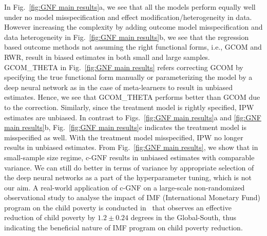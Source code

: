 \documentclass[letterpaper]{article} %
\begin{document}
In Fig.~\ref{fig:GNF main results}a, we see that all the models perform equally well under no model misspecification and effect modification/heterogeneity in data.
However increasing the complexity by adding outcome model misspecification and data heterogeneity in Fig.~\ref{fig:GNF main results}b, we see that the regression based outcome methods not assuming the right functional forms, i.e., GCOM and RWR, result in biased estimates in both small and large samples.
{GCOM\_THETA} in Fig.~\ref{fig:GNF main results} refers correcting GCOM by specifying the true functional form manually or parameterizing the model by a deep neural network as in the case of meta-learners to result in unbiased estimates.
Hence, we see that {GCOM\_THETA} performs better than {GCOM} due to the correction.
Similarly, since the treatment model is rightly specified, IPW estimates are unbiased.
In contrast to Figs.~\ref{fig:GNF main results}a and \ref{fig:GNF main results}b, Fig.~\ref{fig:GNF main results}c indicates the treatment model is misspecified as well. With the treatment model misspecified, IPW no longer results in unbiased estimates.
From Fig.~\ref{fig:GNF main results}, we show that in small-sample size regime, c-GNF results in unbiased estimates with comparable variance.
We can still do better in terms of variance by appropriate selection of the deep neural networks as a part of the hyperparameter tuning, which is not our aim.
A real-world application of c-GNF on a large-scale non-randomized observational study to analyse the impact of IMF (International Monetary Fund) program on the child poverty is conducted in~\citet{balgi2022counterfactual} that observes an effective reduction of child poverty by $1.2{\pm}0.24$ degrees in the Global-South, thus indicating the beneficial nature of IMF program on child poverty reduction.
\end{document}
